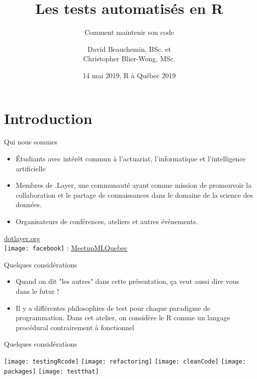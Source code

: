 \documentclass[11pt]{beamer}
\title[Les tests automatisés en R]{Les tests automatisés en R}
\subtitle{Comment maintenir son code}
\author[D. Beauchemin \& C. Blier-Wong]{David Beauchemin, BSc. et \\ Christopher Blier-Wong, MSc.}
\institute[.Layer]
{
	.Layer, Université Laval, CRDM, GRAAL
}
\date{14 mai 2019, R à Québec 2019}
\begin{document}
\begin{frame}[label=titre, plain]
\titlepage
\end{frame}

\section[Introduction]{Introduction}

\begin{frame}{Qui nous sommes}
\begin{itemize}
	\item Étudiants avec intérêt commun à l'actuariat, l'informatique et l'intelligence artificielle
	\item Membres de .Layer, une communauté ayant comme mission de promouvoir la collaboration et le partage de connaissances dans le domaine de la science des données.
	\item Organisateurs de conférences, ateliers et autres événements.
\end{itemize}
\begin{center}
	\href{dotlayer.org}{dotlayer.org}\\
	\texttt{[image: facebook]} : \href{https://www.facebook.com/MeetupMLQuebec/}{MeetupMLQuebec}
\end{center}
\end{frame}

\begin{frame}{Quelques considérations}
\begin{itemize}
\item Quand on dit "les autres" dans cette présentation, ça veut aussi dire vous dans le futur !
\item Il y a différentes philosophies de test pour chaque paradigme de programmation. Dans cet atelier, on considère le \textsf{R} comme un langage procédural contrairement à fonctionnel
\end{itemize}
\end{frame}

\begin{frame}{Quelques considérations}

\texttt{[image: testingRcode]} \hfill
\texttt{[image: refactoring]} \hfill
\texttt{[image: cleanCode]} \hfill
\texttt{[image: packages]} \hfill
\texttt{[image: testthat]}

\end{frame}
\end{document}
